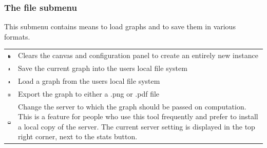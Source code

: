 \subsubsection{The file submenu}
This submenu contains means to load graphs and to save them in various formats.
\begin{tabular}{p{}p{}}
\includegraphics[scale=0.6]{figures/icons/new.png} & Clears the canvas and configuration panel to create an entirely new instance\\
\includegraphics[scale=0.6]{figures/icons/download.png}& Save the current graph into the users local file system\\
\includegraphics[scale=0.6]{figures/icons/upload.png}& Load a graph from the users local file system\\
\includegraphics[scale=0.6]{figures/icons/export.png}& Export the graph to either a .png or .pdf file\\
\includegraphics[scale=0.6]{figures/icons/server.png} &Change the server to which the graph should be passed on computation. This is a feature for people who use this tool frequently and prefer to install a local copy of the server. The current server setting is displayed in the top right corner, next to the stats button. 
\end{tabular}
